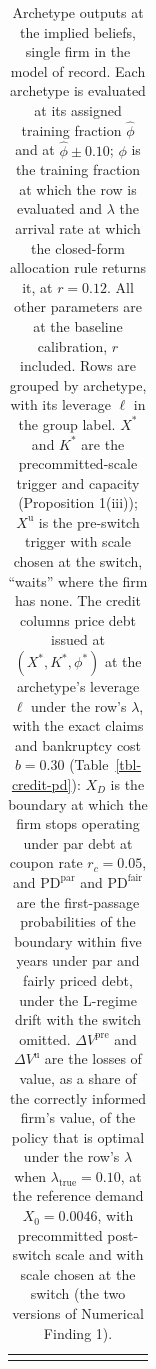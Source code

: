 \documentclass[
  11pt,
  letterpaper,
]{scrartcl}
\newcounter{none} %
\begin{document}
\begingroup\setlength{\tabcolsep}{2.5pt}

\begin{longtable}[]{@{}
  >{\raggedright\arraybackslash}p{}
  >{\raggedleft\arraybackslash}p{}
  >{\raggedleft\arraybackslash}p{}
  >{\raggedleft\arraybackslash}p{}
  >{\raggedleft\arraybackslash}p{}
  >{\raggedleft\arraybackslash}p{}
  >{\raggedleft\arraybackslash}p{}
  >{\raggedleft\arraybackslash}p{}
  >{\raggedleft\arraybackslash}p{}
  >{\raggedleft\arraybackslash}p{}@{}}
\caption{Archetype outputs at the implied beliefs, single firm in the
model of record. Each archetype is evaluated at its assigned training
fraction \(\hat{\phi}\) and at \(\hat{\phi} \pm 0.10\); \(\phi\) is the
training fraction at which the row is evaluated and \(\lambda\) the
arrival rate at which the closed-form allocation rule returns it, at
\(r = 0.12\). All other parameters are at the baseline calibration,
\(r\) included. Rows are grouped by archetype, with its leverage
\(\ell\) in the group label. \(X^*\) and \(K^*\) are the
precommitted-scale trigger and capacity (Proposition 1(iii));
\(X^{\text{u}}\) is the pre-switch trigger with scale chosen at the
switch, ``waits'' where the firm has none. The credit columns price debt
issued at \((X^*, K^*, \phi^*)\) at the archetype's leverage \(\ell\)
under the row's \(\lambda\), with the exact claims and bankruptcy cost
\(b = 0.30\) (Table~\ref{tbl-credit-pd}): \(X_D\) is the boundary at
which the firm stops operating under par debt at coupon rate
\(r_c = 0.05\), and \(\text{PD}^{\text{par}}\) and
\(\text{PD}^{\text{fair}}\) are the first-passage probabilities of the
boundary within five years under par and fairly priced debt, under the
L-regime drift with the switch omitted. \(\Delta V^{\text{pre}}\) and
\(\Delta V^{\text{u}}\) are the losses of value, as a share of the
correctly informed firm's value, of the policy that is optimal under the
row's \(\lambda\) when \(\lambda_{\text{true}} = 0.10\), at the
reference demand \(X_0 = 0.0046\), with precommitted post-switch scale
and with scale chosen at the switch (the two versions of Numerical
Finding 1).}\label{tbl-archetypes}\tabularnewline
\toprule\noalign{}

\end{longtable}
\end{document}
